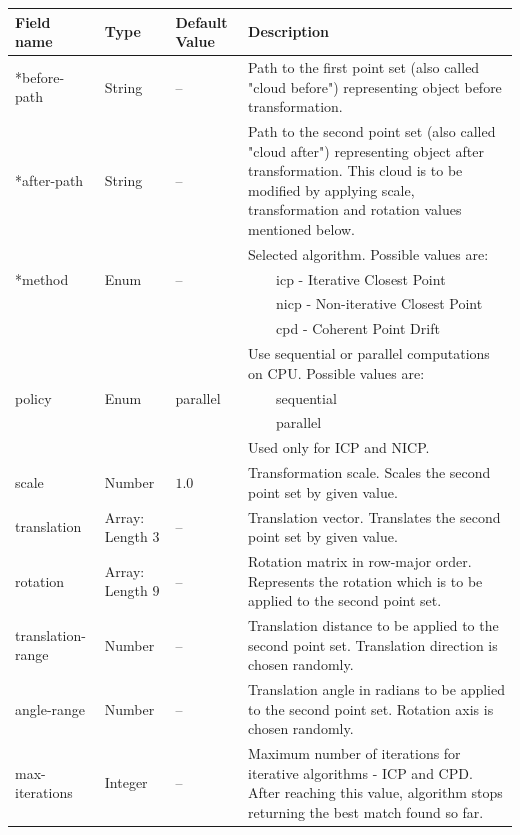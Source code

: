 \documentclass[titlepage]{article}
\newcommand{\tabitem}{~~\llap{\textbullet}~~}
\begin{document}
\begin{center}
\def\arraystretch{1.5}
\begin{longtable}{ | m{13em} | m{5em} | m{3em}| m{19em}| } 
 \hline
 Field name & Type & Default Value & Description \\
 \hline
 \hline
 *before-path & String & -- & Path to the first point set (also called "cloud before") representing object before transformation. \\
 \hline
 *after-path & String & -- & Path to the second point set (also called "cloud after") representing object after transformation. This cloud is to be modified by applying scale, transformation and rotation values mentioned below. \\
 \hline
  & & & Selected algorithm. Possible values are: \\
  *method & Enum & -- & \tabitem icp - Iterative Closest Point \\
  & & & \tabitem nicp - Non-iterative Closest Point \\
  & & & \tabitem cpd - Coherent Point Drift \\
 \hline
  & & & Use sequential or parallel computations on CPU. Possible values are:\\
 policy & Enum & parallel & \tabitem sequential \\
  & & & \tabitem parallel \\
  & & & Used only for ICP and NICP. \\ 
 \hline
 scale & Number & $1.0$ & Transformation scale. Scales the second point set by given value. \\ 
 \hline
 translation & Array: Length $3$ & -- & Translation vector. Translates the second point set by given value. \\ 
 \hline
 rotation & Array: Length $9$ & -- & Rotation matrix in row-major order. Represents the rotation which is to be applied to the second point set. \\ 
 \hline
 translation-range & Number & -- & Translation distance to be applied to the second point set. Translation direction is chosen randomly. \\ 
 \hline
 angle-range & Number & -- & Translation angle in radians to be applied to the second point set. Rotation axis is chosen randomly. \\ 
 \hline
 max-iterations & Integer & -- & Maximum number of iterations for iterative algorithms - ICP and CPD. After reaching this value, algorithm stops returning the best match found so far. \\ 

\end{longtable}
\end{center}
\end{document}
